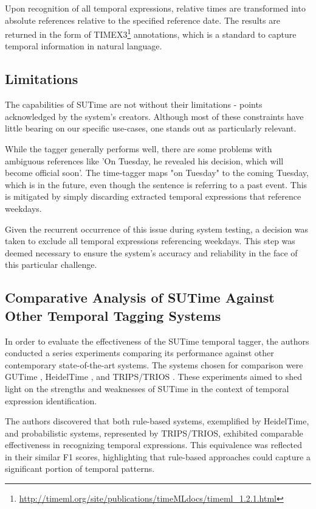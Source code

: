\documentclass[a4paper,10pt]{report} %
\begin{document}
Upon recognition of all temporal expressions, relative times are transformed into absolute references relative to the specified reference date. The results are returned in the form of TIMEX3\footnote{\url{http://timeml.org/site/publications/timeMLdocs/timeml\_1.2.1.html}} annotations, which is a standard to capture temporal information in natural language. \cite{sutime}

\subsection{Limitations}
The capabilities of SUTime are not without their limitations - points acknowledged by the system's creators. Although most of these constraints have little bearing on our specific use-cases, one stands out as particularly relevant.

While the tagger generally performs well, there are some problems with ambiguous references like ’On Tuesday, he revealed his decision, which will become official soon’. The time-tagger maps "on Tuesday" to the coming Tuesday, which is in the future, even though the sentence is referring to a past event. This is mitigated by simply discarding extracted temporal expressions that reference weekdays.

Given the recurrent occurrence of this issue during system testing, a decision was taken to exclude all temporal expressions referencing weekdays. This step was deemed necessary to ensure the system's accuracy and reliability in the face of this particular challenge. \cite{sutime}

\subsection{Comparative Analysis of SUTime Against Other Temporal Tagging Systems}
In order to evaluate the effectiveness of the SUTime temporal tagger, the authors conducted a series experiments comparing its performance against other contemporary state-of-the-art systems. The systems chosen for comparison were GUTime \cite{gutime}, HeidelTime \cite{heideltime}, and TRIPS/TRIOS \cite{trips}. These experiments aimed to shed light on the strengths and weaknesses of SUTime in the context of temporal expression identification.

The authors discovered that both rule-based systems, exemplified by HeidelTime, and probabilistic systems, represented by TRIPS/TRIOS, exhibited comparable effectiveness in recognizing temporal expressions. This equivalence was reflected in their similar F1 scores, highlighting that rule-based approaches could capture a significant portion of temporal patterns.
\end{document}
